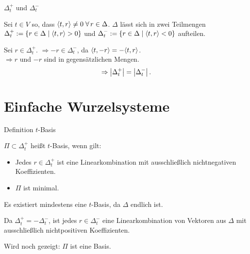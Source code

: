 \documentclass{beamer}
\begin{document}
\begin{frame}{\( \Delta_t^+ \) und \( \Delta_t^- \)}
    \begin{defi}
        Sei \( t \in V \) so, dass \( \scalarprod{t}{r} \neq 0 
        \; \forall r \in \Delta \). \pause
        \( \Delta \) lässt sich in zwei Teilmengen 
        \( \Delta_t^+ := 
        \{r \in \Delta \;\vert \; \langle t, r \rangle > 0\} \) 
        und \( \Delta_t^- := 
        \{r \in \Delta \;\vert \; \langle t, r \rangle < 0\} \) 
        aufteilen. \pause
    \end{defi}
    

    Sei \( r \in \Delta_t^+ \). \( \Rightarrow -r \in \Delta_t^- \), 
    da \( \langle t, -r \rangle = -\langle t, r \rangle \).\\
    \( \Rightarrow r \) und \( -r \) sind in 
    gegensätzlichen Mengen. \pause
    \[ \Rightarrow \left|\Delta_t^+\right| = \left|\Delta_t^-\right|. \]
\end{frame}

\section{Einfache Wurzelsysteme}
\begin{frame}{Definition \( t \)-Basis}
    \begin{defi}
        \( \Pi \subset \Delta_t^+ \) heißt \( t \)-Basis, 
        wenn gilt:
        \begin{itemize}
            \item Jedes \( r \in \Delta_t^+ \) ist 
            eine Linearkombination mit ausschließlich 
            nichtnegativen Koeffizienten.
            \item \( \Pi \) ist minimal.
        \end{itemize} \pause
        Es existiert mindestens eine \( t \)-Basis, 
        da \( \Delta \) endlich ist. \pause
    \end{defi}
    
    
    Da \( \Delta_t^+ = - \Delta_t^- \), ist jedes 
    \( r \in \Delta_t^- \) eine Linearkombination 
    von Vektoren aus \( \Delta \) 
    mit ausschließlich nichtpositiven Koeffizienten.

    \pause
    Wird noch gezeigt: \( \Pi \) ist eine Basis.
\end{frame}
\end{document}
